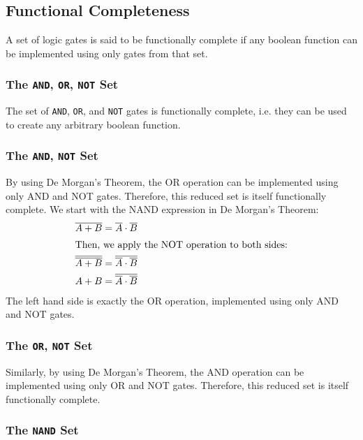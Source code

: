 \subsection{Functional Completeness}\label{subsec:functional-completeness}
\begin{definition}
    A set of logic gates is said to be functionally complete if any boolean function
    can be implemented using only gates from that set.
\end{definition}

\subsubsection{The \texttt{AND}, \texttt{OR}, \texttt{NOT} Set}

The set of \texttt{AND}, \texttt{OR}, and \texttt{NOT} gates is functionally complete,
i.e. they can be used to create any arbitrary boolean function.

\subsubsection{The \texttt{AND}, \texttt{NOT} Set}

By using De Morgan's Theorem, the OR operation can be implemented using only
AND and NOT gates. Therefore, this reduced set is itself functionally
complete. We start with the NAND expression in De Morgan's Theorem:
\begin{align*}
    \overline{A+B} &= \overline{A}\cdot\overline{B} \\
    \intertext{Then, we apply the NOT operation to both sides:}
    \overline{\overline{A+B}} &= \overline{\overline{A}\cdot\overline{B}} \\
    A + B &= \overline{\overline{A}\cdot\overline{B}}
\end{align*}
The left hand side is exactly the OR operation, implemented using only AND and NOT gates.

\subsubsection{The \texttt{OR}, \texttt{NOT} Set}

Similarly, by using De Morgan's Theorem, the AND operation can be implemented using only
OR and NOT gates. Therefore, this reduced set is itself functionally complete.

\subsubsection{The \texttt{NAND} Set}

